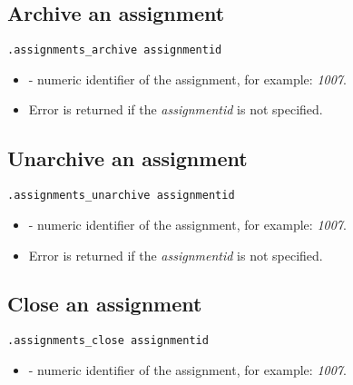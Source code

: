 \subsection{Archive an assignment}

\begin{lstlisting}[style=CommandLineStyle]
.assignments_archive assignmentid
\end{lstlisting}

\paramsheader
\begin{itemize}
    \item {} - numeric identifier of the assignment, for example: \textit{1007}.
\end{itemize}

\errheader
\begin{itemize}
    \item Error  is returned if the \textit{assignmentid} is not specified.
\end{itemize}



\subsection{Unarchive an assignment}

\begin{lstlisting}[style=CommandLineStyle]
.assignments_unarchive assignmentid
\end{lstlisting}

\paramsheader
\begin{itemize}
    \item {} - numeric identifier of the assignment, for example: \textit{1007}.
\end{itemize}

\errheader
\begin{itemize}
    \item Error  is returned if the \textit{assignmentid} is not specified.
\end{itemize}


\subsection{Close an assignment}

\begin{lstlisting}[style=CommandLineStyle]
.assignments_close assignmentid
\end{lstlisting}

\paramsheader
\begin{itemize}
    \item {} - numeric identifier of the assignment, for example: \textit{1007}.
\end{itemize}

